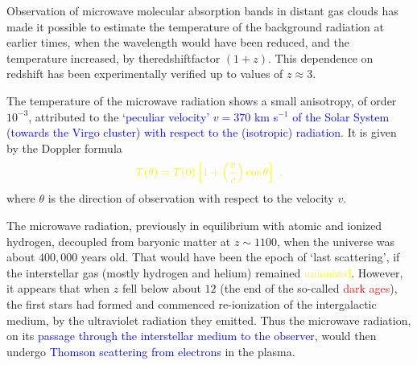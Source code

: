 \documentclass[12pt,a4paper]{article}
\begin{document}
Observation of microwave molecular absorption bands in distant gas clouds has made it possible to estimate the temperature of the background radiation at earlier times, when the wavelength would have been reduced, and the temperature increased, by theredshiftfactor $(1+z)$. This dependence on redshift has been experimentally verified up to values of $z \approx 3$. 

The temperature of the microwave radiation shows a small anisotropy, of order $10^{-3}$, attributed to the \textcolor{blue}{`peculiar velocity' $v = 370$ km s$^{-1}$ of the Solar System (towards the Virgo cluster) with respect to the (isotropic) radiation}. It is given by the Doppler formula 
\begin{equation}
\color{yellow} T(\theta) = T(0) \left[1 + \left(\dfrac{v}{c} \right) \cos \theta \right] ~,
\end{equation}
where $\theta$ is the direction of observation with respect to the velocity $v$.

The microwave radiation, previously in equilibrium with atomic and ionized hydrogen, decoupled from baryonic matter
at $z \sim 1100$, when the universe was about $400,000$ years old. That would have been the epoch of `last scattering', if the interstellar gas (mostly hydrogen and helium) remained \textcolor{yellow}{unionized}. However, it appears that when $z$ fell below about $12$ (the end of the so-called \textcolor{red}{dark ages}), the first stars had formed and commenced re-ionization of the intergalactic medium, by the ultraviolet radiation they emitted. Thus the microwave radiation, on its \textcolor{blue}{passage through the interstellar medium to the observer}, would then undergo \textcolor{blue}{Thomson scattering from electrons} in the plasma.
\end{document}
